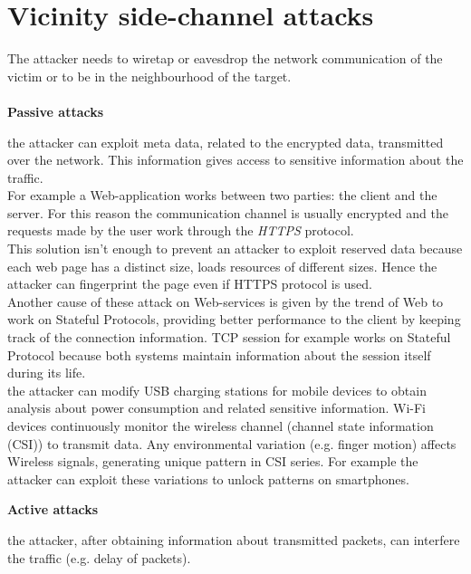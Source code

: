 \section{Vicinity side-channel attacks}
The attacker needs to wiretap or eavesdrop the network communication of the victim or to be in the neighbourhood of the target.\\\\
\textbf{Passive attacks}
\begin{itemize}
{the attacker can exploit meta data, related to the encrypted data, transmitted over the network. This information gives access to sensitive information about the traffic.\\
For example a Web-application works between two parties: the client and the server. For this reason the communication channel is usually encrypted and the requests made by the user work through the \textit{HTTPS} protocol.\\
This solution isn't enough to prevent an attacker to exploit reserved data because each web page has a distinct size, loads resources of different sizes. Hence the attacker can fingerprint the page even if HTTPS protocol is used.\\
Another cause of these attack on Web-services is given by the trend of Web to work on Stateful Protocols, providing better performance to the client by keeping track of the connection information. TCP session for example works on Stateful Protocol because both systems maintain information about the session itself during its life\cite{side_leaks}.\\}
{the attacker can modify USB charging stations for mobile devices to obtain analysis about power consumption and related sensitive information.}
{Wi-Fi devices continuously monitor the wireless channel (channel state information (CSI))
to transmit data. Any environmental variation (e.g. finger motion) affects Wireless signals, generating unique pattern in CSI series. For example the attacker can exploit these variations to unlock patterns on smartphones\cite{side_CSI}.}
\end{itemize}
\textbf{Active attacks}
\begin{itemize}
{the attacker, after obtaining information about transmitted packets, can interfere the traffic (e.g. delay of packets).}
\end{itemize}


